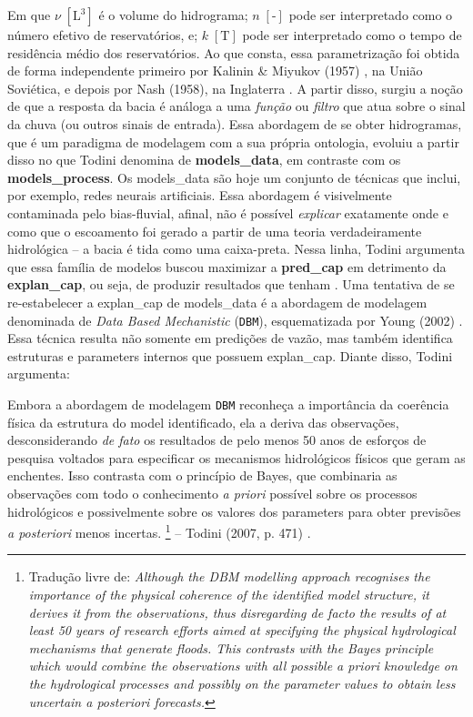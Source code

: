 \documentclass[./main.tex]{subfiles}
\begin{document}
\noindent Em que $\nu \; [\text{L}^{3}]$ é o volume do hidrograma; $n \; [\text{-}]$ pode ser interpretado como o número efetivo de reservatórios, e; $k  \; [\text{T}]$ pode ser interpretado como o tempo de residência médio dos reservatórios. Ao que consta, essa parametrização foi obtida de forma independente primeiro por Kalinin \& Miyukov (1957) \cite{Kalinin1957a}, na União Soviética, e depois por Nash (1958), na Inglaterra \cite{Nash1958a}. A partir disso, surgiu a noção de que a resposta da bacia é análoga a uma \textit{função} ou \textit{filtro} que atua sobre o sinal da chuva (ou outros sinais de entrada). Essa abordagem de se obter hidrogramas, que é um \gls{paradigma} de modelagem com a sua própria ontologia, evoluiu a partir disso no que Todini \cite{Todini2007a} denomina de \textbf{\gls{models_data}}, em contraste com os \textbf{\gls{models_process}}. Os \gls{models_data} são hoje um conjunto de técnicas que inclui, por exemplo, redes neurais artificiais. Essa abordagem é visivelmente contaminada pelo \gls{bias-fluvial}, afinal, não é possível \textit{explicar} exatamente onde e como que o escoamento foi gerado a partir de uma \gls{teoria} verdadeiramente hidrológica -- a bacia é tida como uma caixa-preta. Nessa linha, Todini argumenta que essa família de modelos buscou maximizar a \textbf{\gls{pred_cap}} em detrimento da \textbf{\gls{explan_cap}}, ou seja, de produzir resultados que tenham . Uma tentativa de se re-estabelecer a \gls{explan_cap} de \gls{models_data} é a abordagem de modelagem denominada de \textit{Data Based Mechanistic} (\texttt{DBM}), esquematizada por Young (2002) \cite{Young2002a}. Essa técnica resulta não somente em predições de vazão, mas também identifica estruturas e \gls{parameters} internos que possuem \gls{explan_cap}. Diante disso, Todini argumenta:
\begin{adjustwidth}{100pt}{0pt}
\medskip
\small
Embora a abordagem de modelagem \texttt{DBM} reconheça a importância da coerência física da estrutura do \gls{model} identificado, ela a deriva das observações, desconsiderando \textit{de fato} os resultados de pelo menos 50 anos de esforços de pesquisa voltados para especificar os mecanismos hidrológicos físicos que geram as enchentes. Isso contrasta com o princípio de Bayes, que combinaria as observações com todo o conhecimento \textit{a priori} possível sobre os processos hidrológicos e possivelmente sobre os valores dos \gls{parameters} para obter previsões \textit{a posteriori} menos incertas.
\footnote{Tradução livre de: 
\textit{
Although the DBM modelling approach recognises the importance of the  physical coherence of the identified model structure, it derives it from the observations, thus disregarding de facto the results of at least 50 years of research efforts aimed at specifying the physical hydrological mechanisms that generate floods. This contrasts with the Bayes principle which would combine the observations with all possible a priori knowledge on the hydrological processes and possibly on the parameter values to obtain less uncertain a posteriori forecasts.
}} -- Todini (2007, p. 471) \cite{Todini2007a}.
\medskip
\end{adjustwidth}
\end{document}
